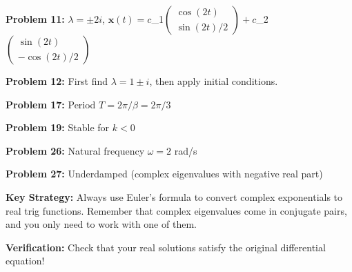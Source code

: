 \documentclass[12pt]{article}
\begin{document}
\textbf{Problem 11:} $\lambda = \pm 2i$, $\mathbf{x}(t) = c$_{1}$\begin{pmatrix} \cos(2t) \\ \sin(2t)/2 \end{pmatrix} + c$_{2}$\begin{pmatrix} \sin(2t) \\ -\cos(2t)/2 \end{pmatrix}$

\textbf{Problem 12:} First find $\lambda = 1 \pm i$, then apply initial conditions.

\textbf{Problem 17:} Period $T = 2\pi/\beta = 2\pi/3$

\textbf{Problem 19:} Stable for $k < 0$

\textbf{Problem 26:} Natural frequency $\omega = 2$ rad/s

\textbf{Problem 27:} Underdamped (complex eigenvalues with negative real part)

\textbf{Key Strategy:} Always use Euler's formula to convert complex exponentials to real trig functions. Remember that complex eigenvalues come in conjugate pairs, and you only need to work with one of them.

\textbf{Verification:} Check that your real solutions satisfy the original differential equation!
\end{document}
